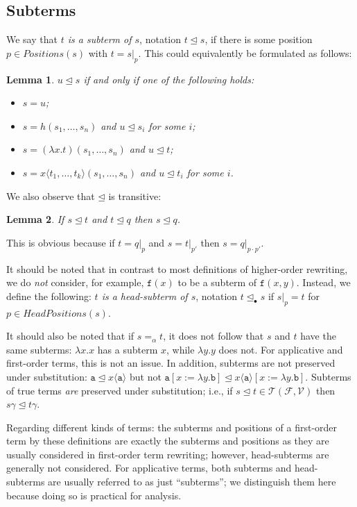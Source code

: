 \documentclass{lmcs}
\theoremstyle{theorem}\newtheorem{theorem}{Theorem}
\theoremstyle{theorem}\newtheorem{lemma}[theorem]{Lemma}
\theoremstyle{theorem}\newtheorem{corollary}[theorem]{Corollary}
\theoremstyle{definition}\newtheorem{definition}[theorem]{Definition}
\theoremstyle{definition}\newtheorem{example}[theorem]{Example}
\newcommand{\F}{\mathcal{F}}
\newcommand{\V}{\mathcal{V}}
\newcommand{\Terms}{\mathcal{T}}
\newcommand{\Positions}{\mathit{Positions}}
\newcommand{\HeadPositions}{\mathit{HeadPositions}}
\newcommand{\identifier}[1]{\mathtt{#1}}
\newcommand{\afun}{\identifier{f}}
\newcommand{\avar}{x}
\newcommand{\bvar}{y}
\newcommand{\abs}[2]{\lambda #1.#2}
\newcommand{\meta}[2]{#1\langle#2\rangle}
\newcommand{\subtermeq}{\unlhd}
\newcommand{\headsubtermeq}{\unlhd_{\bullet}}
\newcommand{\symb}[1]{\mathtt{#1}}
\begin{document}
\subsection{Subterms}

We say that \emph{$t$ is a subterm of $s$}, notation $t \subtermeq s$, if there is some position
$p \in \Positions(s)$ with $t = s|_p$.  This could equivalently be formulated as follows:

\begin{lemma}
$u \subtermeq s$ if and only if one of the following holds:
\begin{itemize}
\item $s = u$;
\item $s = h(s_1,\dots,s_n)$ and $u \subtermeq s_i$ for some $i$;
\item $s = (\abs{x}{t})(s_1,\dots,s_n)$ and $u \subtermeq t$;
\item $s = \meta{x}{t_1,\dots,t_k}(s_1,\dots,s_n)$ and $u \subtermeq t_i$ for some $i$.
\end{itemize}
\end{lemma}

We also observe that $\subtermeq$ is transitive:

\begin{lemma}
If $s \subtermeq t$ and $t \subtermeq q$ then $s \subtermeq q$.
\end{lemma}

This is obvious because if $t = q|_p$ and $s = t|_{p'}$ then $s = q|_{p \cdot p'}$.

It should be noted that in contrast to most definitions of higher-order rewriting, we do \emph{not}
consider, for example, $\afun(x)$ to be a subterm of $\afun(x,y)$.  Instead, we define the
following: \emph{$t$ is a head-subterm of $s$}, notation $t \headsubtermeq s$ if $s|_p = t$ for
$p \in \HeadPositions(s)$.

It should also be noted that if $s =_\alpha t$, it does not follow that $s$ and $t$ have the same
subterms: $\abs{x}{x}$ has a subterm $x$, while $\abs{y}{y}$ does not.  For applicative and
first-order terms, this is not an issue.
In addition, subterms are not preserved under substitution: $\symb{a} \subtermeq \meta{\avar}{\symb{a}}$
but not $\symb{a}[\avar:=\abs{\bvar}{\symb{b}}] \subtermeq \meta{\avar}{\symb{a}}[\avar:=\abs{\bvar}{\symb{b}}]$.
Subterms of true terms \emph{are} preserved under substitution; i.e., if $s \subtermeq t
\in \Terms(\F,\V)$ then $s\gamma \subtermeq t\gamma$.

Regarding different kinds of terms: the subterms and positions of a first-order term by these
definitions are exactly the subterms and positions as they are usually considered in first-order
term rewriting; however, head-subterms are generally not considered.  For applicative terms,
both subterms and head-subterms are usually referred to as just ``subterms''; we distinguish them
here because doing so is practical for analysis.
\end{document}
